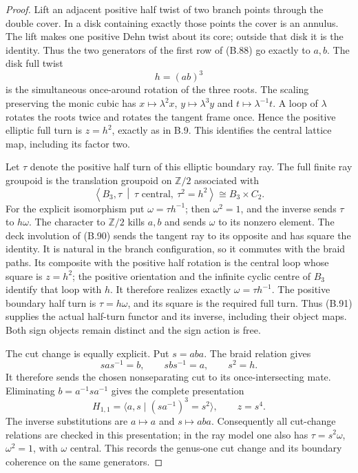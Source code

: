\begin{proof}
Lift an adjacent positive half twist of two branch points
through the double cover.  In a disk containing exactly
those points the cover is an annulus.  The lift makes one
positive Dehn twist about its core; outside that disk it is
the identity.  Thus the two generators of the first row of
(B.88) go exactly to $a,b$.  The disk full twist
\[
 h=(ab)^3
\]
is the simultaneous once-around rotation of the three roots.
The scaling preserving the monic cubic has
$x\mapsto\lambda^2x$, $y\mapsto\lambda^3y$ and
$t\mapsto\lambda^{-1}t$.  A loop of $\lambda$ rotates the
roots twice and rotates the tangent frame once.  Hence the
positive elliptic full turn is $z=h^2$, exactly as in B.9.
This identifies the central lattice map, including its
factor two.

Let $\tau$ denote the positive half turn of this elliptic
boundary ray.  The full finite ray groupoid is the translation
groupoid on $\mathbb Z/2$ associated with
\[
 \left\langle B_3,\tau\ \middle|\
       \tau\text{ central},\ \tau^2=h^2\right\rangle
       \cong B_3\times C_2.                                   \tag{B.91}
\]
For the explicit isomorphism put $\omega=\tau h^{-1}$;
then $\omega^2=1$, and the inverse sends $\tau$ to $h\omega$.
The character to $\mathbb Z/2$ kills $a,b$ and sends $\omega$
to its nonzero element.  The deck involution of (B.90) sends
the tangent ray to its opposite and has square the identity.
It is natural in the branch configuration, so it commutes
with the braid paths.  Its composite with the positive
half rotation is the central loop whose square is $z=h^2$;
the positive orientation and the infinite cyclic centre
of $B_3$ identify that loop with $h$.  It therefore realizes
exactly $\omega=\tau h^{-1}$.  The positive boundary half turn is
$\tau=h\omega$, and its square is the required full turn.
Thus (B.91) supplies the actual half-turn functor and its
inverse, including their object maps.  Both sign objects
remain distinct and the sign action is free.

The cut change is equally explicit.  Put $s=aba$.  The
braid relation gives
\[
 sas^{-1}=b,\qquad sbs^{-1}=a,\qquad s^2=h.
                                                               \tag{B.92}
\]
It therefore sends the chosen nonseparating cut to its
once-intersecting mate.  Eliminating $b=a^{-1}sa^{-1}$ gives
the complete presentation
\[
 H_{1,1}=\langle a,s\mid (sa^{-1})^3=s^2\rangle,
       \qquad z=s^4.                                          \tag{B.93}
\]
The inverse substitutions are $a\mapsto a$ and $s\mapsto aba$.
Consequently all cut-change relations are checked in this
presentation; in the ray model one also has
$\tau=s^2\omega$, $\omega^2=1$, with $\omega$ central.
This records the genus-one cut change and its boundary
coherence on the same generators.


\end{proof}
